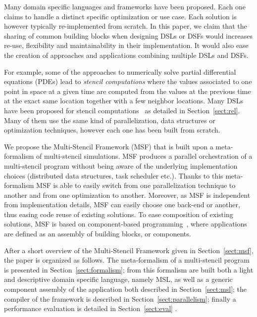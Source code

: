 Many domain specific languages and frameworks have been proposed. Each one claims to handle a distinct specific optimization or use case.
Each solution is however typically re-implemented from scratch.
In this paper, we claim that the sharing of common building blocks when designing DSLs or DSFs would increases re-use, flexibility and maintainability in their implementation.
It would also ease the creation of approaches and applications combining multiple DSLs and DSFs.

For example, some of the approaches to numerically solve partial differential equations (PDEs) lead to \emph{stencil computations} where the values associated to one point in space at a given time are computed from the values at the previous time at the exact same location together with a few neighbor locations.
Many DSLs have been proposed for stencil computations~\cite{spaaTangCKLL11,citeulike12258902,Ragan-Kelley:2013:HLC:2491956.2462176,DeVito:2011:LDS:2063384.2063396,Camier:2015:IPP:2820083.2820107} as detailed in Section~\ref{sect:rel}.
Many of them use the same kind of parallelization, data structures or optimization techniques, however each one has been built from scratch. 

We propose the Multi-Stencil Framework (MSF) that is built upon a meta-formalism of multi-stencil simulations. MSF produces a parallel orchestration of a multi-stencil program without being aware of the underlying implementation choices (\eg distributed data structures, task scheduler etc.). Thanks to this meta-formalism MSF is able to easily switch from one parallelization technique to another and from one optimization to another. Moreover, as MSF is independent from implementation details, MSF can easily choose one back-end or another, thus easing code reuse of existing solutions.
To ease composition of existing solutions, MSF is based on component-based programming~\cite{Szyperski:2002:CSB:515228}, where applications are defined as an assembly of building blocks, or components.

After a short overview of the Multi-Stencil Framework given in Section~\ref{sect:msf}, the paper is organized as follows. The meta-formalism of a multi-stencil program is presented in Section~\ref{sect:formalism}; from this formalism are built both a light and descriptive domain specific language, namely MSL, as well as a generic component assembly of the application both described in Section~\ref{sect:msl}; the compiler of the framework is described in Section~\ref{sect:parallelism}; finally a performance evaluation is detailed in Section~\ref{sect:eval} .

